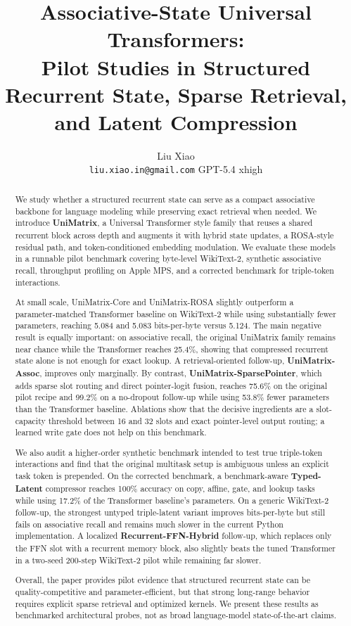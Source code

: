 \documentclass[11pt]{article}
\title{Associative-State Universal Transformers:\\
\large Pilot Studies in Structured Recurrent State, Sparse Retrieval, and Latent Compression}
\author{
Liu Xiao \\
\texttt{liu.xiao.in@gmail.com}
\And
GPT-5.4 xhigh
}
\date{}
\begin{document}
\maketitle

\begin{abstract}
We study whether a structured recurrent state can serve as a compact
associative backbone for language modeling while preserving exact retrieval
when needed. We introduce \textbf{UniMatrix}, a Universal Transformer style
family that reuses a shared recurrent block across depth and augments it with
hybrid state updates, a ROSA-style residual path, and token-conditioned
embedding modulation. We evaluate these models in a runnable pilot benchmark
covering byte-level WikiText-2, synthetic associative recall, throughput
profiling on Apple MPS, and a corrected benchmark for triple-token
interactions.

At small scale, UniMatrix-Core and UniMatrix-ROSA slightly outperform a
parameter-matched Transformer baseline on WikiText-2 while using substantially
fewer parameters, reaching 5.084 and 5.083 bits-per-byte versus 5.124. The
main negative result is equally important: on associative recall, the original
UniMatrix family remains near chance while the Transformer reaches 25.4\%,
showing that compressed recurrent state alone is not enough for exact lookup.
A retrieval-oriented follow-up, \textbf{UniMatrix-Assoc}, improves only
marginally. By contrast, \textbf{UniMatrix-SparsePointer}, which adds sparse
slot routing and direct pointer-logit fusion, reaches 75.6\% on the original
pilot recipe and 99.2\% on a no-dropout follow-up while using 53.8\% fewer
parameters than the Transformer baseline. Ablations show that the decisive
ingredients are a slot-capacity threshold between 16 and 32 slots and exact
pointer-level output routing; a learned write gate does not help on this
benchmark.

We also audit a higher-order synthetic benchmark intended to test true
triple-token interactions and find that the original multitask setup is
ambiguous unless an explicit task token is prepended. On the corrected
benchmark, a benchmark-aware \textbf{Typed-Latent} compressor reaches 100\%
accuracy on copy, affine, gate, and lookup tasks while using 17.2\% of the
Transformer baseline's parameters. On a generic WikiText-2 follow-up, the
strongest untyped triple-latent variant improves bits-per-byte but still fails
on associative recall and remains much slower in the current Python
implementation. A localized \textbf{Recurrent-FFN-Hybrid} follow-up, which
replaces only the FFN slot with a recurrent memory block, also slightly beats
the tuned Transformer in a two-seed 200-step WikiText-2 pilot while remaining
far slower.

Overall, the paper provides pilot evidence that structured recurrent state can
be quality-competitive and parameter-efficient, but that strong long-range
behavior requires explicit sparse retrieval and optimized kernels. We present
these results as benchmarked architectural probes, not as broad language-model
state-of-the-art claims.
\end{abstract}
\end{document}
